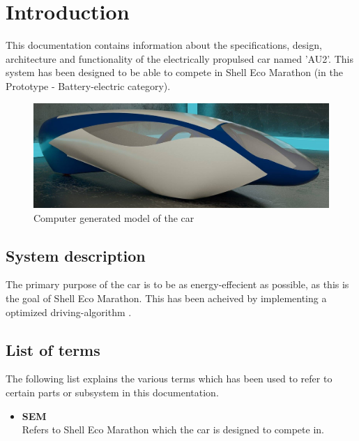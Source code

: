 \chapter{Introduction}
This documentation contains information about the specifications, design, architecture and functionality of the electrically propulsed car named 'AU2'. This system has been designed to be able to compete in Shell Eco Marathon (in the Prototype - Battery-electric category).

\begin{figure}[H]
	\centering
	\includegraphics[width=0.5\linewidth]{Introduction/Model}
	\caption{Computer generated model of the car}
	\label{fig:System_model}
\end{figure}

\section{System description}
The primary purpose of the car is to be as energy-effecient as possible, as this is the goal of Shell Eco Marathon. This has been acheived by implementing a optimized driving-algorithm .

\section{List of terms}
The following list explains the various terms which has been used to refer to certain parts or subsystem in this documentation.

\begin{itemize}
	\item \textbf{SEM}\\
	Refers to Shell Eco Marathon which the car is designed to compete in.
\end{itemize}